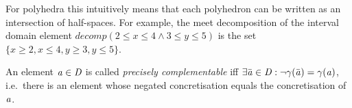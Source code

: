 For polyhedra this intuitively means that each polyhedron can be
written as an intersection of half-spaces.
%
For example, the meet decomposition of the interval domain element
$decomp(2\leq x\leq 4 \wedge 3\leq y\leq 5)$ is
the set $\{x\geq 2, x\leq 4, y\geq 3, y\leq 5\}$.

\begin{definition} 
An element $\mathit{a}\in \mathit{D}$ is called \emph{precisely complementable}
iff $\exists \bar{\mathit{a}} \in \mathit{D}: \neg\gamma(\bar{\mathit{a}})=\gamma(\mathit{a})$, 
i.e.\ there is an element whose negated concretisation equals
the concretisation of $\mathit{a}$.
\end{definition}

